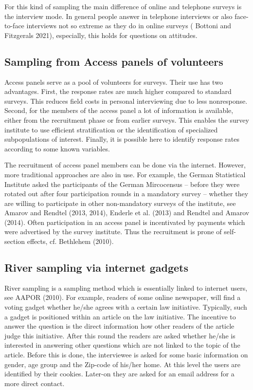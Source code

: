 \documentclass[a4paper , 11pt]{article}
\begin{document}
For this kind of sampling the main difference of online and telephone surveys is the interview mode. In general people answer in telephone interviews or also face-to-face interviews not so extreme as they do in online surveys ( Bottoni and Fitzgerals 2021), especially, this holds for questions on attitudes.

\subsection{Sampling from Access panels of volunteers}

Access panels serve as a pool of volunteers for surveys. Their use has two advantages. First, the response rates are much higher compared to standard surveys. This reduces field costs in personal interviewing due to less nonresponse. Second, for the members of the access panel a lot of information is available, either from the recruitment phase or from earlier surveys. This enables the survey institute to use efficient stratification or the identification of specialized subpopulations of interest. Finally, it is possible here to identify response rates according to some known variables.

The recruitment of access panel members can be done via the internet. However, more traditional approaches are also in use. For example, the German Statistical Institute asked the participants of the German Mircocensus -- before they were rotated out after four participation rounds in a mandatory survey -- whether they are willing to participate in other non-mandatory surveys of the institute, see Amarov and Rendtel (2013, 2014), Enderle et al. (2013) and Rendtel and Amarov (2014). Often participation in an access panel is incentivated by payments which were advertised by the survey institute. Thus the recruitment is prone of self-section effects, cf. Bethlehem (2010).

\subsection{River sampling via internet gadgets}

River sampling is a sampling method which is essentially linked to internet users, see AAPOR (2010). For example, readers of some online newspaper, will find a voting gadget whether he/she agrees with a certain law initiative. Typically, such a gadget is positioned within an article on the law initiative. The incentive to answer the question is the direct information how other readers of the article judge this initiative. After this round the readers are asked whether he/she is interested in answering other questions which are not linked to the topic of the article. Before this is done, the interviewee is asked for some basic information on gender, age group and the Zip-code of his/her home. At this level the users are identified by their cookies. Later-on they are asked for an email address for a more direct contact.
\end{document}
